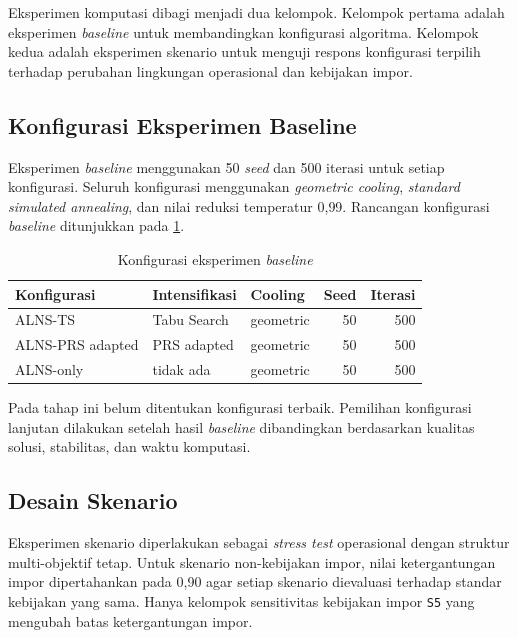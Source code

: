 \documentclass{file/TA-ITS}
\theoremstyle{definition}
\theoremstyle{definition}
\theoremstyle{plain}
\begin{document}
Eksperimen komputasi dibagi menjadi dua kelompok. Kelompok pertama adalah eksperimen \textit{baseline} untuk membandingkan konfigurasi algoritma. Kelompok kedua adalah eksperimen skenario untuk menguji respons konfigurasi terpilih terhadap perubahan lingkungan operasional dan kebijakan impor.

\subsection{Konfigurasi Eksperimen Baseline}

Eksperimen \textit{baseline} menggunakan 50 \textit{seed} dan 500 iterasi untuk setiap konfigurasi. Seluruh konfigurasi menggunakan \textit{geometric cooling}, \textit{standard simulated annealing}, dan nilai reduksi temperatur 0{,}99. Rancangan konfigurasi \textit{baseline} ditunjukkan pada \ref{tab:baseline_config}.

\begin{table}[H]
\centering
\caption{Konfigurasi eksperimen \textit{baseline}}
\label{tab:baseline_config}
\begin{tabular}{@{}lllrr@{}}
\toprule
\textbf{Konfigurasi} & \textbf{Intensifikasi} & \textbf{Cooling} & \textbf{Seed} & \textbf{Iterasi} \\
\midrule
ALNS-TS & Tabu Search & geometric & 50 & 500 \\
ALNS-PRS adapted & PRS adapted & geometric & 50 & 500 \\
ALNS-only & tidak ada & geometric & 50 & 500 \\
\bottomrule
\end{tabular}
\end{table}
Pada tahap ini belum ditentukan konfigurasi terbaik. Pemilihan konfigurasi lanjutan dilakukan setelah hasil \textit{baseline} dibandingkan berdasarkan kualitas solusi, stabilitas, dan waktu komputasi.

\subsection{Desain Skenario}

Eksperimen skenario diperlakukan sebagai \textit{stress test} operasional dengan struktur multi-objektif tetap. Untuk skenario non-kebijakan impor, nilai ketergantungan impor dipertahankan pada 0{,}90 agar setiap skenario dievaluasi terhadap standar kebijakan yang sama. Hanya kelompok sensitivitas kebijakan impor \texttt{S5} yang mengubah batas ketergantungan impor.
\end{document}
